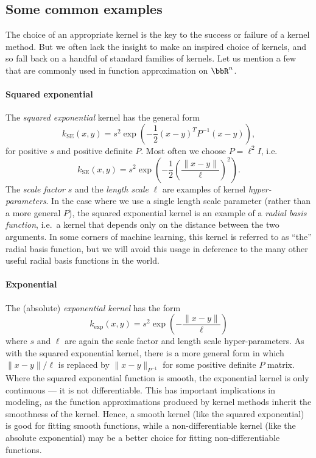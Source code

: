 \documentclass[12pt, leqno]{article} %
\begin{document}
\subsection{Some common examples}

The choice of an appropriate kernel is the key to the success
or failure of a kernel method.  But we often lack the insight to make
an inspired choice of kernels, and so fall back on a handful of
standard families of kernels.  Let us mention a few
that are commonly used in function approximation on $\bbR^n$.

\paragraph*{Squared exponential}
The {\em squared exponential} kernel has the general form
\[
  k_{\mathrm{SE}}(x,y) =
    s^2 \exp\left( -\frac{1}{2} (x-y)^T P^{-1} (x-y) \right),
\]
for positive $s$ and positive definite $P$.  Most often we
choose $P = \ell^2 I$, i.e.
\[
  k_{\mathrm{SE}}(x,y) =
    s^2 \exp\left( -\frac{1}{2} \left(\frac{\|x-y\|}{\ell} \right)^2 \right).
\]
The {\em scale factor} $s$ and the {\em length scale} $\ell$ are
examples of kernel {\em hyper-parameters}.  In the case where we use a
single length scale parameter (rather than a more general $P$), the
squared exponential kernel is an example of
a {\em radial basis function}, i.e.~a kernel that depends only on
the distance between the two arguments.  In some corners of machine
learning, this kernel is referred to as ``the'' radial basis function,
but we will avoid this usage in deference to the many other useful
radial basis functions in the world.

\paragraph*{Exponential}
The (absolute) {\em exponential kernel} has the form
\[
  k_{\mathrm{exp}}(x,y) =
    s^2 \exp\left( -\frac{\|x-y\|}{\ell} \right)
\]
where $s$ and $\ell$ are again the scale factor and length scale
hyper-parameters.  As with the squared exponential kernel, there
is a more general form in which $\|x-y\|/\ell$ is replaced by
$\|x-y\|_{P^{-1}}$ for some positive definite $P$ matrix.
Where the squared exponential function is smooth,
the exponential kernel is only continuous --- it is not
differentiable.  This has important implications in modeling,
as the function approximations produced by kernel methods inherit the
smoothness of the kernel.  Hence, a smooth kernel (like the squared
exponential) is good for fitting smooth functions, while a
non-differentiable kernel (like the absolute exponential) may be a
better choice for fitting non-differentiable functions.
\end{document}
